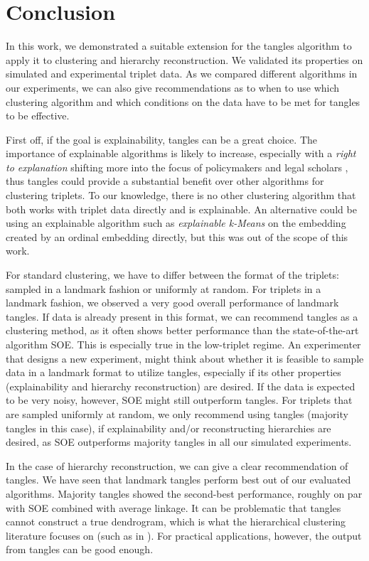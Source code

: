 \chapter{Conclusion}\label{conclusion}
In this work, we demonstrated a suitable extension for the tangles algorithm to apply it to clustering and hierarchy reconstruction. 
We validated its properties on simulated and experimental triplet data.  
As we compared different algorithms in our experiments, we can also give recommendations as to when to use which clustering algorithm and which conditions on the data
have to be met for tangles to be effective. 

First off, if the goal is explainability, tangles can be a great choice. 
The importance of explainable algorithms is likely to increase, especially with 
a \textit{right to explanation} shifting more into the focus of policymakers and legal
scholars \citep{selbstMeaningfulInformationRight2017}, thus tangles could provide a substantial benefit over other algorithms for clustering triplets.
To our knowledge, there is no other clustering algorithm that both works with triplet data directly and is explainable. 
An alternative could be using an explainable algorithm such as \textit{explainable k-Means} \citep{moshkovitzExplainableKMeansKMedians2020} on the embedding created 
by an ordinal embedding directly, but this was out of the scope of this work. 

For standard clustering, we have to differ between the format of the triplets: sampled in a landmark fashion or uniformly at random.
For triplets in a landmark fashion, we observed a very good overall performance of landmark tangles.
If data is already present in this format, we can recommend
tangles as a clustering method, as it often shows better performance than the state-of-the-art algorithm SOE. This is especially true in the low-triplet regime. 
An experimenter that designs a new experiment, might think about whether it is feasible to sample data in a landmark format to utilize tangles, 
especially if its other properties (explainability and hierarchy reconstruction) are desired. 
If the data is expected to be very noisy, however, SOE might still outperform tangles.  
For triplets that are sampled uniformly at random, we only recommend using tangles (majority tangles in this case), if explainability and/or reconstructing hierarchies are desired, as SOE 
outperforms majority tangles in all our simulated experiments.

In the case of hierarchy reconstruction, we can give a clear recommendation of tangles. We have seen that landmark tangles perform best out of our evaluated algorithms. Majority tangles 
showed the second-best performance, roughly on par with SOE combined with average linkage. 
It can be problematic that tangles cannot construct a true dendrogram, which is what the hierarchical clustering literature focuses on (such as in \cite{ghoshdastidarFoundationsComparisonBasedHierarchical2019}).  For practical applications, however, the output from tangles can be good enough. 

